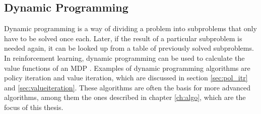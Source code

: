 \subsection{Dynamic Programming }

Dynamic programming is a way of dividing a problem into subproblems that only have to be solved once each. Later, if the result of a particular subproblem is needed again, it can be looked up from a table of previously solved subproblems. In reinforcement learning, dynamic programming can be used to calculate the value functions of an MDP \parencite{bellman1957mdp}. Examples of dynamic programming algorithms are policy iteration and value iteration, which are discussed in section \ref{sec:pol_itr} and \ref{sec:valueiteration}. These algorithms are often the basis for more advanced algorithms, among them the ones described in chapter \ref{ch:algo}, which are the focus of this thesis. 